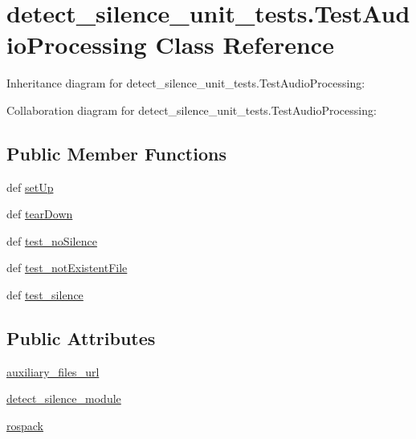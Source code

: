 \hypertarget{classdetect__silence__unit__tests_1_1TestAudioProcessing}{\section{detect\-\_\-silence\-\_\-unit\-\_\-tests.\-Test\-Audio\-Processing Class Reference}
\label{classdetect__silence__unit__tests_1_1TestAudioProcessing}
}


Inheritance diagram for detect\-\_\-silence\-\_\-unit\-\_\-tests.\-Test\-Audio\-Processing\-:


Collaboration diagram for detect\-\_\-silence\-\_\-unit\-\_\-tests.\-Test\-Audio\-Processing\-:
\subsection*{Public Member Functions}
\begin{DoxyCompactItemize}
\item 
def \hyperlink{classdetect__silence__unit__tests_1_1TestAudioProcessing_a58df9540e3c490ad3060290a1f589714}{set\-Up}
\item 
def \hyperlink{classdetect__silence__unit__tests_1_1TestAudioProcessing_a04d23b9397b02367663ed9baca6c6860}{tear\-Down}
\item 
def \hyperlink{classdetect__silence__unit__tests_1_1TestAudioProcessing_a32cc654195575a3036122a1902dc612b}{test\-\_\-no\-Silence}
\item 
def \hyperlink{classdetect__silence__unit__tests_1_1TestAudioProcessing_acfd75c9a5d2b40194db63e2722870d20}{test\-\_\-not\-Existent\-File}
\item 
def \hyperlink{classdetect__silence__unit__tests_1_1TestAudioProcessing_a77b1ac9c346d4b12b4beed73d546acff}{test\-\_\-silence}
\end{DoxyCompactItemize}
\subsection*{Public Attributes}
\begin{DoxyCompactItemize}
\item 
\hyperlink{classdetect__silence__unit__tests_1_1TestAudioProcessing_a7c1bc7c6a2cca72c00260613a7c20bec}{auxiliary\-\_\-files\-\_\-url}
\item 
\hyperlink{classdetect__silence__unit__tests_1_1TestAudioProcessing_a091f6edd6c581d6bfb165a2aca2fd170}{detect\-\_\-silence\-\_\-module}
\item 
\hyperlink{classdetect__silence__unit__tests_1_1TestAudioProcessing_a484d0d9f66b7ff88516f206070db6afb}{rospack}
\end{DoxyCompactItemize}


